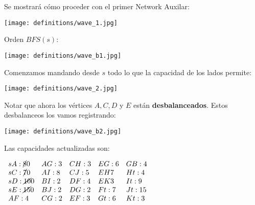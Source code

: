\documentclass[10pt,a4paper]{article}
\begin{document}
Se mostrará cómo proceder con el primer Network Auxilar:

\begin{center}

    \begin{adjustbox}{max size={\textwidth}{\textheight}}
        \texttt{[image: definitions/wave\_1.jpg]}
        \end{adjustbox}
    
\end{center}

Orden $BFS(s)$:

\begin{center}

    \begin{adjustbox}{max size={\textwidth}{\textheight}}
        \texttt{[image: definitions/wave\_b1.jpg]}
        \end{adjustbox}
    
\end{center}

Comenzamos mandando desde $s$ todo lo que la capacidad de los lados permite:

\begin{center}

    \begin{adjustbox}{max size={\textwidth}{\textheight}}
        \texttt{[image: definitions/wave\_2.jpg]}
        \end{adjustbox}
    
\end{center}

Notar que ahora los vértices $A, C, D$ y $E$ están \textbf{desbalanceados}. Estos desbalanceos los vamos registrando:

\begin{center}

    \begin{adjustbox}{max size={\textwidth}{\textheight}}
        \texttt{[image: definitions/wave\_b2.jpg]}
        \end{adjustbox}
    
\end{center}

Las capacidades actualizadas son:

\begin{center}
$\begin{array}{lllll} sA:\cancel{8} 0 & AG: 3 & CH: 3 & EG: 6 & GB:4\\ sC:\cancel{7 } 0 & AI: 8 & CJ: 5 & EH 7 & Ht: 4\\ sD:\cancel{10} 0 & BI: 2 & DF:4 & EK 3 & It: 9\\ sE: \cancel{15} 0 &BJ: 2 & DG: 2 & Ft: 7 & Jt: 15\\ AF: 4 & CG: 2 & EF: 3 & Gt: 6 & Kt: 3\\ \end{array}$
\end{center}
\end{document}
